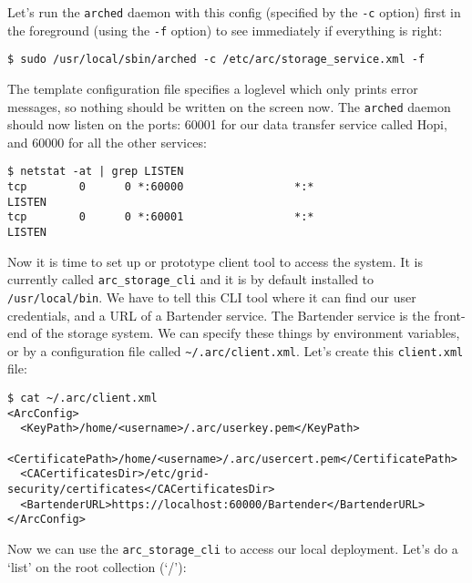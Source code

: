\documentclass{book}
\begin{document}
Let's run the \verb!arched! daemon with this config (specified by the \verb!-c! option) first in the foreground (using the \verb!-f! option) to see immediately if everything is right:

\begin{verbatim}
$ sudo /usr/local/sbin/arched -c /etc/arc/storage_service.xml -f
\end{verbatim}

The template configuration file specifies a loglevel which only prints error messages, so nothing should be written on the screen now.
The \verb!arched! daemon should now listen on the ports: 60001 for our data transfer service called Hopi, and 60000 for all the other services:

\begin{verbatim}
$ netstat -at | grep LISTEN
tcp        0      0 *:60000                 *:*                     LISTEN     
tcp        0      0 *:60001                 *:*                     LISTEN     
\end{verbatim}

Now it is time to set up or prototype client tool to access the system. It is currently called \verb!arc_storage_cli! and it is by default installed to \verb!/usr/local/bin!. We have to tell this CLI tool where it can find our user credentials, and a URL of a Bartender service. The Bartender service is the front-end of the storage system. We can specify these things by environment variables, or by a configuration file called \verb!~/.arc/client.xml!. Let's create this \verb!client.xml! file:

\begin{verbatim}
$ cat ~/.arc/client.xml 
<ArcConfig>
  <KeyPath>/home/<username>/.arc/userkey.pem</KeyPath>
  <CertificatePath>/home/<username>/.arc/usercert.pem</CertificatePath>
  <CACertificatesDir>/etc/grid-security/certificates</CACertificatesDir>
  <BartenderURL>https://localhost:60000/Bartender</BartenderURL>
</ArcConfig>
\end{verbatim}

Now we can use the \verb!arc_storage_cli! to access our local deployment. Let's do a `list' on the root collection (`/'):
\end{document}
